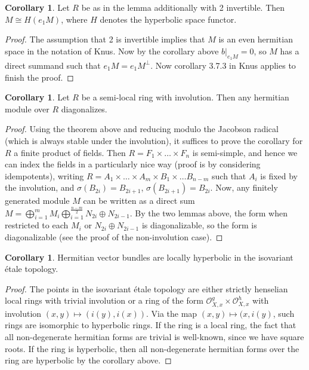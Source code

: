 \documentclass[draftthesis,tocnosub,noragright,centerchapter,10pt]{uiucthesis2009}
\newcommand{\mc}{\mathcal}
\theoremstyle{plain}
\theoremstyle{definition}
\newtheorem{corollary}[lemma]{Corollary}
\begin{document}
\begin{corollary} \label{HermFormsOverSwitch} 
Let $R$ be as in the lemma additionally with 2 invertible. Then $M \cong H(e_1M)$, where $H$ denotes
the hyperbolic space functor. 
\end{corollary}

\begin{proof}
The assumption that 2 is invertible implies that $M$ is an even
hermitian space in the notation of Knus. Now by the corollary above
$b|_{e_1M} = 0$, so $M$ has a direct summand such that $e_1M =
e_1M^{\perp}$. Now corollary 3.7.3 in Knus applies to finish the proof.
\end{proof}

\begin{corollary}
Let $R$ be a semi-local ring with involution. Then any hermitian
module over $R$ diagonalizes.
\end{corollary}

\begin{proof}
Using the theorem above and reducing modulo the Jacobson radical
(which is always stable under the involution), it
suffices to prove the corollary for $R$ a finite product of
fields. Then $R = F_1 \times \dots \times F_n$ is semi-simple, and
hence we can index the fields in a particularly nice way (proof is by
considering idempotents), writing $R = A_1 \times \dots \times A_m \times B_1 \times
\dots B_{n-m}$ such that $A_i$ is fixed by the involution, and
$\sigma(B_{2i}) = B_{2i+1}$, $\sigma(B_{2i+1}) = B_{2i}$. Now, any
finitely generated module $M$ can be written as a direct sum $M =
\bigoplus_{i=1}^m M_i \bigoplus_{i=1}^{\frac{n-m}{2}} N_{2i} \oplus
N_{2i-1}$. By the two lemmas above, the form when restricted to each
$M_i$ or $N_{2i} \oplus N_{2i-1}$ is diagonalizable, so the form is
diagonalizable (see the proof of the non-involution case).   
\end{proof}


\begin{corollary}
Hermitian vector bundles are locally hyperbolic in the isovariant \'etale topology.
\end{corollary}

\begin{proof}
The points in the isovariant \'etale topology are either strictly
henselian local rings with
trivial involution or a ring of the form $\mc O_{X,x}^g \times \mc
O_{X,x}^h$ with involution $(x,y) \mapsto (i(y),i(x))$. Via the map
$(x,y) \mapsto (x,i(y)$, such rings are isomorphic to hyperbolic rings. If the ring is a local ring, the fact that all non-degenerate hermitian
forms are trivial is well-known, since we have square roots. If the
ring is hyperbolic, then all non-degenerate hermitian forms over the
ring are hyperbolic by the corollary above.
\end{proof}
\end{document}
